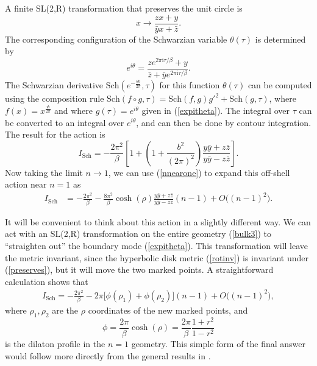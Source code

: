 \documentclass[12pt]{article}
\newcommand{\be}{\begin{equation}}
\newcommand{\ee}{\end{equation}}
\numberwithin{equation}{section}
\begin{document}
A finite SL(2,R) transformation that preserves the unit circle is
\be\label{preserves}
x \rightarrow \frac{zx  +y}{\bar{y}x + \bar{z}}.
\ee
The corresponding configuration of the Schwarzian variable $\theta(\tau)$ is determined by
\be
e^{i\theta} = \frac{z e^{2\pi \mathrm{i}\tau/\beta} + y}{\bar{z} + \bar{y}e^{2\pi \mathrm{i}\tau/\beta}}.\label{expitheta}
\ee
The Schwarzian derivative $\text{Sch}(e^{-\frac{\theta b}{2\pi}},\tau)$ for this function $\theta(\tau)$ can be computed using the composition rule $\text{Sch}(f\circ g,\tau) = \text{Sch}(f,g)g'^2 + \text{Sch}(g,\tau)$, where $f(x) = x^{\frac{\mathrm{i}b}{2\pi}}$ and where $g(\tau) = e^{i\theta}$ given in (\ref{expitheta}). The integral over $\tau$ can be converted to an integral over $e^{i\theta}$, and can then be done by contour integration. The result for the action is
\be
I_{\text{Sch}} = -\frac{2\pi^2}{\beta}\left[1 + \left(1 + \frac{b^2}{(2\pi)^2}\right)\frac{y \bar{y} + z\bar{z}}{y\bar{y} - z\bar{z}}\right].\label{schactio}
\ee
Now taking the limit $n\rightarrow 1$, we can use (\ref{nnearone}) to expand this off-shell action near $n = 1$ as
\begin{align}
I_{\text{Sch}} &= -\frac{2\pi^2}{\beta} -\frac{8\pi^2}{\beta}\cosh(\rho)\frac{y \bar{y} + z\bar{z}}{y\bar{y} - z\bar{z}}(n-1) + O\big((n{-}1)^2\big).
\end{align}

It will be convenient to think about this action in a slightly different way. We can act with an SL(2,R) transformation on the entire geometry (\ref{bulk3}) to ``straighten out'' the boundary mode (\ref{expitheta}). This transformation will leave the metric invariant, since the hyperbolic disk metric (\ref{rotinv}) is invariant under (\ref{preserves}), but it will move the two marked points. A straightforward calculation shows that
\begin{align}
I_{\text{Sch}}=-\frac{2\pi^2}{\beta} - 2\pi \big[\phi(\rho_1) +\phi(\rho_2)\big](n-1)+ O\big((n{-}1)^2\big),\label{offshell}
\end{align}
where $\rho_1,\rho_2$ are the $\rho$ coordinates of the new marked points, and 
\be
\phi = \frac{2\pi}{\beta}\cosh(\rho) = \frac{2\pi}{\beta}\frac{1+r^2}{1-r^2}
\ee
is the dilaton profile in the $n = 1$ geometry. This simple form of the final answer would follow more directly from the general results in \cite{Lewkowycz:2013nqa,Dong:2017xht}.
\end{document}
